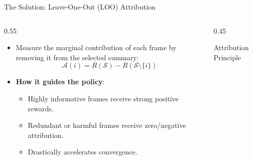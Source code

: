 \documentclass[aspectratio=169]{beamer}
\begin{document}
\begin{frame}{The Solution: Leave-One-Out (LOO) Attribution}
    \begin{columns}
        \begin{column}{0.55\textwidth}
            \begin{itemize}
                \item Measure the marginal contribution of each frame by removing it from the selected summary:
                \begin{equation*}
                    \mathcal{A}(i) = R(\mathcal{S}) - R(\mathcal{S} \setminus \{i\})
                \end{equation*}
                \item \textbf{How it guides the policy}:
                \begin{itemize}
                    \item Highly informative frames receive strong positive rewards.
                    \item Redundant or harmful frames receive zero/negative attribution.
                    \item Drastically accelerates convergence.
                \end{itemize}
            \end{itemize}
        \end{column}
        \begin{column}{0.45\textwidth}
            \begin{block}{Attribution Principle}
                \centering
            \end{block}
        \end{column}
    \end{columns}
\end{frame}
\end{document}
